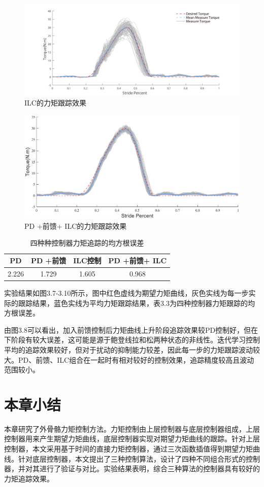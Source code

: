 \begin{figure}[!htb]
    \includegraphics[width=17cm]{fig/f58.png}
    \caption{ILC的力矩跟踪效果}
    \label{fig:mark}
\end{figure}
\begin{figure}[!htb]
    \includegraphics[width=17cm]{fig/f59.eps}
    \caption{PD +前馈+ ILC的力矩跟踪效果}
    \label{fig:mark}
\end{figure}

\begin{table}[!htb]
    \caption[控制参数]{四种种控制器力矩追踪的均方根误差}
    \begin{tabular}{cccc}
      \toprule
        PD & PD +前馈 & ILC控制 & PD +前馈+ ILC \\
      \midrule
        2.226 & 1.729 & 1.605 & 0.968 \\
      \bottomrule
    \end{tabular}
\end{table}

实验结果如图3.7-3.10所示，图中红色虚线为期望力矩曲线，灰色实线为每一步实际的跟踪结果，蓝色实线为平均力矩跟踪结果，表3.3为四种控制器力矩跟踪的均方根误差。

由图3.8可以看出，加入前馈控制后力矩曲线上升阶段追踪效果较PD控制好，但在下阶段有较大误差，这可能是源于鲍登线拉和松两种状态的非线性。迭代学习控制平均的追踪效果较好，但对于扰动的抑制能力较差，因此每一步的力矩跟踪波动较大。PD、前馈、ILC组合在一起时有相对较好的控制效果，追踪精度较高且波动范围较小。

\section{本章小结}

本章研究了外骨骼力矩控制方法。力矩控制由上层控制器与底层控制器组成，上层控制器用来产生期望力矩曲线，底层控制器实现对期望力矩曲线的跟踪。针对上层控制器，本文采用基于时间的直接力矩控制器，通过三次函数插值得到期望力矩曲线。针对底层控制器，本文提出了三种控制算法，设计了四种不同组合形式的控制器，并对其进行了验证与对比。实验结果表明，综合三种算法的控制器具有较好的力矩追踪效果。